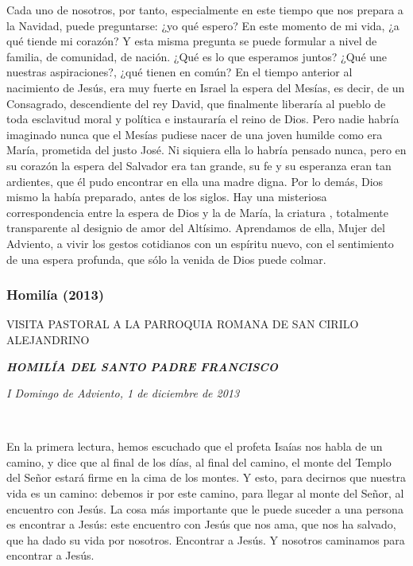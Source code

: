 Cada uno de nosotros, por tanto, especialmente en este tiempo que nos prepara a la Navidad, puede preguntarse: ¿yo qué espero? En este momento de mi vida, ¿a qué tiende mi corazón? Y esta misma pregunta se puede formular a nivel de familia, de comunidad, de nación. ¿Qué es lo que esperamos juntos? ¿Qué une nuestras aspiraciones?, ¿qué tienen en común? En el tiempo anterior al nacimiento de Jesús, era muy fuerte en Israel la espera del Mesías, es decir, de un Consagrado, descendiente del rey David, que finalmente liberaría al pueblo de toda esclavitud moral y política e instauraría el reino de Dios. Pero nadie habría imaginado nunca que el Mesías pudiese nacer de una joven humilde como era María, prometida del justo José. Ni siquiera ella lo habría pensado nunca, pero en su corazón la espera del Salvador era tan grande, su fe y su esperanza eran tan ardientes, que él pudo encontrar en ella una madre digna. Por lo demás, Dios mismo la había preparado, antes de los siglos. Hay una misteriosa correspondencia entre la espera de Dios y la de María, la criatura , totalmente transparente al designio de amor del Altísimo. Aprendamos de ella, Mujer del Adviento, a vivir los gestos cotidianos con un espíritu nuevo, con el sentimiento de una espera profunda, que sólo la venida de Dios puede colmar.

\subsubsection{Homilía (2013)} VISITA PASTORAL A LA PARROQUIA ROMANA DE SAN CIRILO ALEJANDRINO

\textbf{\emph{HOMILÍA DEL SANTO PADRE FRANCISCO}}

\emph{I Domingo de Adviento, 1 de diciembre de 2013}


~

En la primera lectura, hemos escuchado que el profeta Isaías nos habla de un camino, y dice que al final de los días, al final del camino, el monte del Templo del Señor estará firme en la cima de los montes. Y esto, para decirnos que nuestra vida es un camino: debemos ir por este camino, para llegar al monte del Señor, al encuentro con Jesús. La cosa más importante que le puede suceder a una persona es encontrar a Jesús: este encuentro con Jesús que nos ama, que nos ha salvado, que ha dado su vida por nosotros. Encontrar a Jesús. Y nosotros caminamos para encontrar a Jesús.

